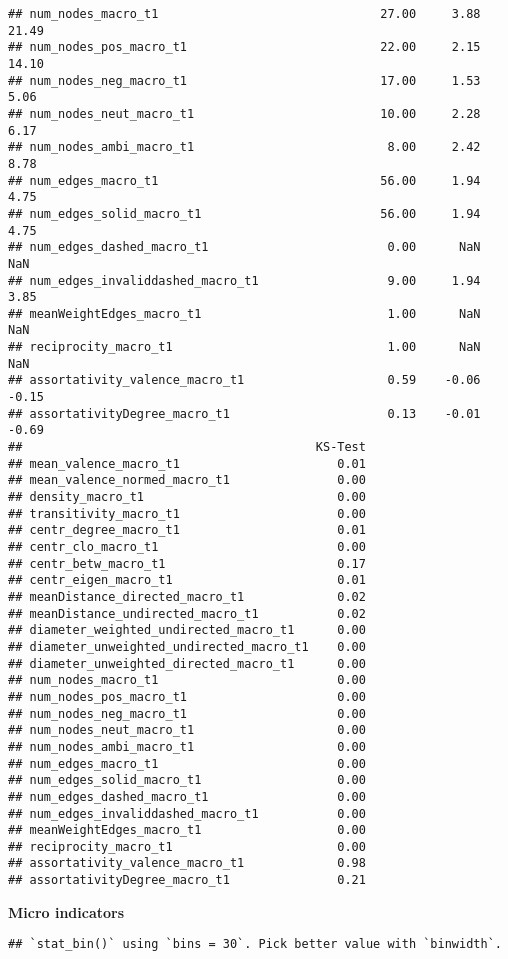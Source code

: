 \documentclass[
]{article}
\begin{document}
\begin{verbatim}
## num_nodes_macro_t1                               27.00     3.88        21.49
## num_nodes_pos_macro_t1                           22.00     2.15        14.10
## num_nodes_neg_macro_t1                           17.00     1.53         5.06
## num_nodes_neut_macro_t1                          10.00     2.28         6.17
## num_nodes_ambi_macro_t1                           8.00     2.42         8.78
## num_edges_macro_t1                               56.00     1.94         4.75
## num_edges_solid_macro_t1                         56.00     1.94         4.75
## num_edges_dashed_macro_t1                         0.00      NaN          NaN
## num_edges_invaliddashed_macro_t1                  9.00     1.94         3.85
## meanWeightEdges_macro_t1                          1.00      NaN          NaN
## reciprocity_macro_t1                              1.00      NaN          NaN
## assortativity_valence_macro_t1                    0.59    -0.06        -0.15
## assortativityDegree_macro_t1                      0.13    -0.01        -0.69
##                                         KS-Test
## mean_valence_macro_t1                      0.01
## mean_valence_normed_macro_t1               0.00
## density_macro_t1                           0.00
## transitivity_macro_t1                      0.00
## centr_degree_macro_t1                      0.01
## centr_clo_macro_t1                         0.00
## centr_betw_macro_t1                        0.17
## centr_eigen_macro_t1                       0.01
## meanDistance_directed_macro_t1             0.02
## meanDistance_undirected_macro_t1           0.02
## diameter_weighted_undirected_macro_t1      0.00
## diameter_unweighted_undirected_macro_t1    0.00
## diameter_unweighted_directed_macro_t1      0.00
## num_nodes_macro_t1                         0.00
## num_nodes_pos_macro_t1                     0.00
## num_nodes_neg_macro_t1                     0.00
## num_nodes_neut_macro_t1                    0.00
## num_nodes_ambi_macro_t1                    0.00
## num_edges_macro_t1                         0.00
## num_edges_solid_macro_t1                   0.00
## num_edges_dashed_macro_t1                  0.00
## num_edges_invaliddashed_macro_t1           0.00
## meanWeightEdges_macro_t1                   0.00
## reciprocity_macro_t1                       0.00
## assortativity_valence_macro_t1             0.98
## assortativityDegree_macro_t1               0.21
\end{verbatim}

\textbf{Micro indicators}

\begin{verbatim}
## `stat_bin()` using `bins = 30`. Pick better value with `binwidth`.
\end{verbatim}
\end{document}
